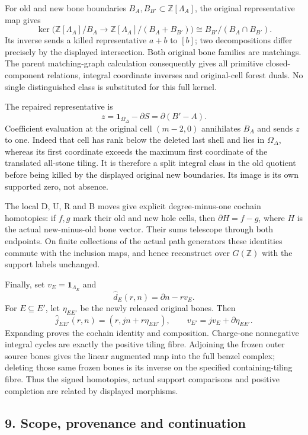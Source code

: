 For old and new bone boundaries
\(B_A,B_{B'}\subset\mathbb Z[\Lambda_A]\), the original representative
map gives \[
\ker\bigl(\mathbb Z[\Lambda_A]/B_A\to\mathbb Z[\Lambda_A]/(B_A+B_{B'})\bigr)
\cong B_{B'}/(B_A\cap B_{B'}).
\] Its inverse sends a killed representative \(a+b\) to \([b]\); two
decompositions differ precisely by the displayed intersection. Both
original bone families are matchings. The parent matching-graph
calculation consequently gives all primitive closed-component relations,
integral coordinate inverses and original-cell forest duals. No single
distinguished class is substituted for this full kernel.

The repaired representative is \[
z=\mathbf1_{\Omega_\Delta}-\partial S=\partial(B'-A).
\] Coefficient evaluation at the original cell \((m-2,0)\) annihilates
\(B_A\) and sends \(z\) to one. Indeed that cell has rank below the
deleted last shell and lies in \(\Omega_\Delta\), whereas its first
coordinate exceeds the maximum first coordinate of the translated
all-stone tiling. It is therefore a split integral class in the old
quotient before being killed by the displayed original new boundaries.
Its image is its own supported zero, not absence.

The local D, U, R and B moves give explicit degree-minus-one cochain
homotopies: if \(f,g\) mark their old and new hole cells, then
\(\partial H=f-g\), where \(H\) is the actual new-minus-old bone vector.
Their sums telescope through both endpoints. On finite collections of
the actual path generators these identities commute with the inclusion
maps, and hence reconstruct over \(G(\mathbb Z)\) with the support
labels unchanged.

Finally, set \(v_E=\mathbf1_{\Lambda_E}\) and \[
\widehat d_E(r,n)=\partial n-rv_E.
\] For \(E\subseteq E'\), let \(\eta_{EE'}\) be the newly released
original bones. Then \[
\widehat j_{EE'}(r,n)=(r,jn+r\eta_{EE'}),\qquad
v_{E'}=jv_E+\partial\eta_{EE'}.
\] Expanding proves the cochain identity and composition. Charge-one
nonnegative integral cycles are exactly the positive tiling fibre.
Adjoining the frozen outer source bones gives the linear augmented map
into the full benzel complex; deleting those same frozen bones is its
inverse on the specified containing-tiling fibre. Thus the signed
homotopies, actual support comparisons and positive completion are
related by displayed morphisms.

\subsection{9. Scope, provenance and
continuation}\label{scope-provenance-and-continuation}

